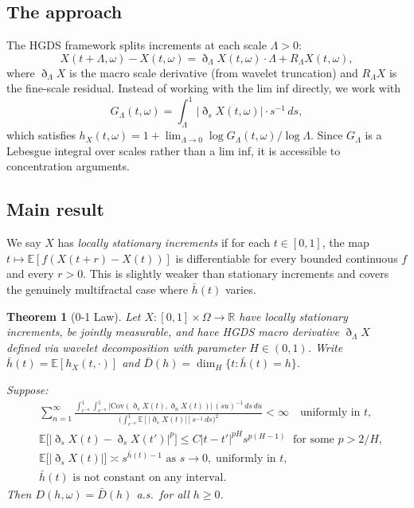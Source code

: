 \documentclass[11pt,a4paper]{article}
\newtheorem{theorem}{Theorem}[section]
\theoremstyle{definition}
\theoremstyle{remark}
\newcommand{\E}{\mathbb{E}}
\newcommand{\R}{\mathbb{R}}
\newcommand{\GL}{G_\Lambda}
\newcommand{\hb}{\bar{h}}
\begin{document}
\subsection{The approach}

The HGDS framework \cite{hgds1,hgds2,hgds3} splits increments at each
scale $\Lambda>0$:
\[
  X(t+\Lambda,\omega)-X(t,\omega)
  = \eth_\Lambda X(t,\omega)\cdot\Lambda + R_\Lambda X(t,\omega),
\]
where $\eth_\Lambda X$ is the macro scale derivative (from wavelet
truncation) and $R_\Lambda X$ is the fine-scale residual. Instead of
working with the lim inf directly, we work with
\[
  \GL(t,\omega) = \int_\Lambda^1|\eth_s X(t,\omega)|\cdot s^{-1}\,ds,
\]
which satisfies $h_X(t,\omega)=1+\lim_{\Lambda\to0}\log\GL(t,\omega)/
\log\Lambda$. Since $\GL$ is a Lebesgue integral over scales rather
than a lim inf, it is accessible to concentration arguments.

\subsection{Main result}

We say $X$ has \emph{locally stationary increments} if for each
$t\in[0,1]$, the map $t\mapsto\E[f(X(t+r)-X(t))]$ is differentiable
for every bounded continuous $f$ and every $r>0$. This is slightly
weaker than stationary increments and covers the genuinely multifractal
case where $\hb(t)$ varies.

\begin{theorem}[0-1 Law]\label{thm:main}
Let $X:[0,1]\times\Omega\to\R$ have locally stationary increments, be
jointly measurable, and have HGDS macro derivative $\eth_\Lambda X$
defined via wavelet decomposition with parameter $H\in(0,1)$. Write
$\hb(t)=\E[h_X(t,\cdot)]$ and $\bar D(h)=\dim_H\{t:\hb(t)=h\}$.

Suppose:
\begin{align}
  &\sum_{n=1}^\infty
  \frac{\int_{e^{-n}}^1\!\int_{e^{-n}}^1
    |\mathrm{Cov}(\eth_s X(t),\eth_u X(t))|\,(su)^{-1}\,ds\,du}
  {\bigl(\int_{e^{-n}}^1\E[|\eth_s X(t)|]s^{-1}\,ds\bigr)^2}
  <\infty\quad\text{uniformly in }t,\tag{C-i}\\
  &\E\bigl[|\eth_s X(t)-\eth_s X(t')|^p\bigr]
  \le C|t-t'|^{pH}s^{p(H-1)}
  \;\text{ for some }p>2/H,\tag{C-ii}\\
  &\E\bigl[|\eth_s X(t)|\bigr]\asymp s^{\hb(t)-1}
  \text{ as }s\to0,\;\text{uniformly in }t,\tag{C-iii}\\
  &\hb(t)\text{ is not constant on any interval.}\tag{C-iv}
\end{align}
Then $D(h,\omega)=\bar D(h)$ a.s.\ for all $h\ge0$.
\end{theorem}
\end{document}
